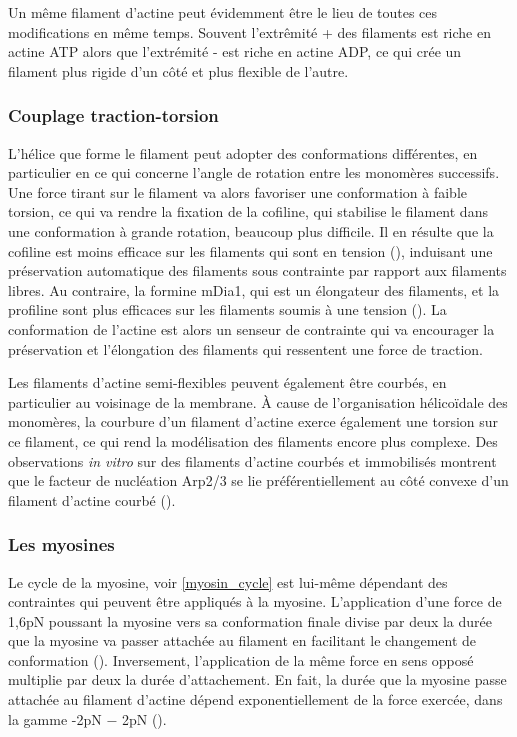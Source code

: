 Un même filament d'actine peut évidemment être le lieu de toutes ces modifications en même temps. Souvent l'extrêmité + des filaments est riche en actine ATP alors que l'extrémité - est riche en actine ADP, ce qui crée un filament plus rigide d'un côté et plus flexible de l'autre. 

\subsubsection{Couplage traction-torsion}

L'hélice que forme le filament peut adopter des conformations différentes, en particulier en ce qui concerne l'angle de rotation entre les monomères successifs. 
Une force tirant sur le filament va alors favoriser une conformation à faible torsion, ce qui va rendre la fixation de la cofiline, qui stabilise le filament dans une conformation à grande rotation, beaucoup plus difficile. 
Il en résulte que la cofiline est moins efficace sur les filaments qui sont en tension (\cite{hayakawa_actin_2011}), induisant une préservation automatique des filaments sous contrainte par rapport aux filaments libres. 
Au contraire, la formine mDia1, qui est un élongateur des filaments, et la profiline sont plus efficaces sur les filaments soumis à une tension (\cite{higashida_f-_2013}). 
La conformation de l'actine est alors un senseur de contrainte qui va encourager la préservation et l'élongation des filaments qui ressentent une force de traction. 

Les filaments d'actine semi-flexibles peuvent également être courbés, en particulier au voisinage de la membrane. 
À cause de l'organisation hélicoïdale des monomères, la courbure d'un filament d'actine exerce également une torsion sur ce filament, ce qui rend la modélisation des filaments encore plus complexe. 
Des observations \textit{in vitro} sur des filaments d'actine courbés et immobilisés montrent que le facteur de nucléation Arp2/3 se lie préférentiellement au côté convexe d'un filament d'actine courbé (\cite{risca_actin_2012}). 

\subsubsection{Les myosines}

Le cycle de la myosine, voir \ref{myosin_cycle} est lui-même dépendant des contraintes qui peuvent être appliqués à la myosine. 
L'application d'une force de 1,6pN poussant la myosine vers sa conformation finale divise par deux la durée que la myosine va passer attachée au filament en facilitant le changement de conformation (\cite{veigel_load-dependent_2003}). 
Inversement, l'application de la même force en sens opposé multiplie par deux la durée d'attachement. 
En fait, la durée que la myosine passe attachée au filament d'actine dépend exponentiellement de la force exercée, dans la gamme -2pN $-$ 2pN (\cite{veigel_load-dependent_2003}). 

